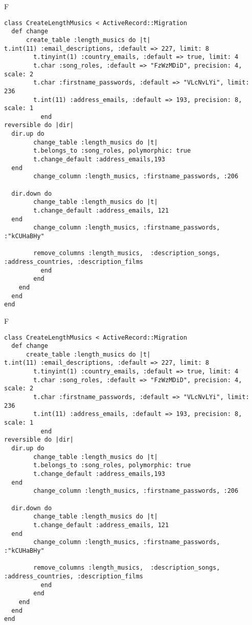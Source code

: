 F
\begin{verbatim}
class CreateLengthMusics < ActiveRecord::Migration
  def change
	  create_table :length_musics do |t|
t.int(11) :email_descriptions, :default => 227, limit: 8
		t.tinyint(1) :country_emails, :default => true, limit: 4
		t.char :song_roles, :default => "FzWzMDiD", precision: 4, scale: 2
		t.char :firstname_passwords, :default => "VLcNvLYi", limit: 236
		t.int(11) :address_emails, :default => 193, precision: 8, scale: 1
		  end
reversible do |dir|
  dir.up do
		change_table :length_musics do |t|
		t.belongs_to :song_roles, polymorphic: true
 		t.change_default :address_emails,193
  end
 		change_column :length_musics, :firstname_passwords, :206
   
  dir.down do
		change_table :length_musics do |t|
		t.change_default :address_emails, 121
  end
 		change_column :length_musics, :firstname_passwords, :"kCUHaBHy"
   
		remove_columns :length_musics,  :description_songs, :address_countries, :description_films 
	      end
	    end
    end 
  end
end

\end{verbatim}

F
\begin{verbatim}
class CreateLengthMusics < ActiveRecord::Migration
  def change
	  create_table :length_musics do |t|
t.int(11) :email_descriptions, :default => 227, limit: 8
		t.tinyint(1) :country_emails, :default => true, limit: 4
		t.char :song_roles, :default => "FzWzMDiD", precision: 4, scale: 2
		t.char :firstname_passwords, :default => "VLcNvLYi", limit: 236
		t.int(11) :address_emails, :default => 193, precision: 8, scale: 1
		  end
reversible do |dir|
  dir.up do
		change_table :length_musics do |t|
		t.belongs_to :song_roles, polymorphic: true
 		t.change_default :address_emails,193
  end
 		change_column :length_musics, :firstname_passwords, :206
   
  dir.down do
		change_table :length_musics do |t|
		t.change_default :address_emails, 121
  end
 		change_column :length_musics, :firstname_passwords, :"kCUHaBHy"
   
		remove_columns :length_musics,  :description_songs, :address_countries, :description_films 
	      end
	    end
    end 
  end
end

\end{verbatim}

